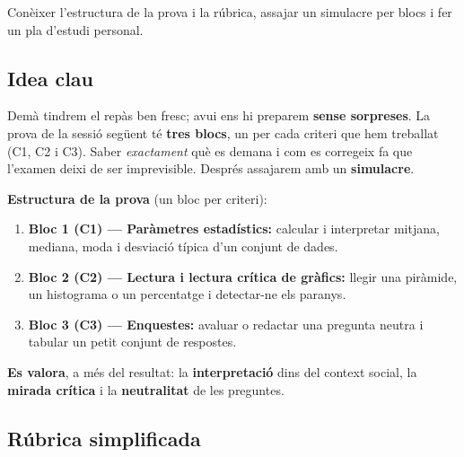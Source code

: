 %
{Conèixer l'estructura de la prova i la rúbrica, assajar un simulacre per blocs i fer un pla d'estudi personal.}

\subsection{Idea clau}

Demà tindrem el repàs ben fresc; avui ens hi preparem \textbf{sense sorpreses}. La
prova de la sessió següent té \textbf{tres blocs}, un per cada criteri que hem
treballat (C1, C2 i C3). Saber \emph{exactament} què es demana i com es corregeix fa
que l'examen deixi de ser imprevisible. Després assajarem amb un \textbf{simulacre}.

\begin{idea}
\textbf{Estructura de la prova} (un bloc per criteri):
\begin{enumerate}[leftmargin=1.6em, itemsep=2pt]
  \item \textbf{Bloc 1 (C1) — Paràmetres estadístics:} calcular i interpretar mitjana,
        mediana, moda i desviació típica d'un conjunt de dades.
  \item \textbf{Bloc 2 (C2) — Lectura i lectura crítica de gràfics:} llegir una
        piràmide, un histograma o un percentatge i detectar-ne els paranys.
  \item \textbf{Bloc 3 (C3) — Enquestes:} avaluar o redactar una pregunta neutra i
        tabular un petit conjunt de respostes.
\end{enumerate}
\textbf{Es valora}, a més del resultat: la \textbf{interpretació} dins del context
social, la \textbf{mirada crítica} i la \textbf{neutralitat} de les preguntes.
\end{idea}

\subsection{Rúbrica simplificada}

